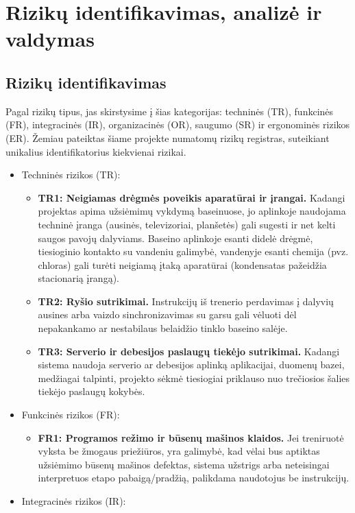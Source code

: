 \section{Rizikų identifikavimas, analizė ir valdymas}
\subsection{Rizikų identifikavimas}
Pagal rizikų tipus, jas skirstysime į šias kategorijas: techninės (TR), funkcinės (FR), integracinės (IR), organizacinės (OR), saugumo (SR) ir ergonominės rizikos (ER). Žemiau pateiktas šiame projekte numatomų rizikų registras, suteikiant unikalius identifikatorius kiekvienai rizikai.

\begin{itemize}
    \item Techninės rizikos (TR):
    \begin{itemize}
        \item \textbf{TR1: Neigiamas drėgmės poveikis aparatūrai ir įrangai.} Kadangi projektas apima užsiėmimų vykdymą baseinuose, jo aplinkoje naudojama techninė įranga (ausinės, televizoriai, planšetės) gali sugesti ir net kelti saugos pavojų dalyviams. Baseino aplinkoje esanti didelė drėgmė, tiesioginio kontakto su vandeniu galimybė, vandenyje esanti chemija (pvz. chloras) gali turėti neigiamą įtaką aparatūrai (kondensatas pažeidžia stacionarią įrangą).
        \item \textbf{TR2: Ryšio sutrikimai.} Instrukcijų iš trenerio perdavimas į dalyvių ausines arba vaizdo sinchronizavimas su garsu gali vėluoti dėl nepakankamo ar nestabilaus belaidžio tinklo baseino salėje.
        \item \textbf{TR3: Serverio ir debesijos paslaugų tiekėjo sutrikimai.} Kadangi sistema naudoja serverio ar debesijos aplinką aplikacijai, duomenų bazei, medžiagai talpinti, projekto sėkmė tiesiogiai priklauso nuo trečiosios šalies tiekėjo paslaugų kokybės.
    \end{itemize}
    \item Funkcinės rizikos (FR):
    \begin{itemize}
        \item \textbf{FR1: Programos režimo ir būsenų mašinos klaidos.} Jei treniruotė vyksta be žmogaus priežiūros, yra galimybė, kad vėlai bus aptiktas užsiėmimo būsenų mašinos defektas, sistema užstrigs arba neteisingai interpretuos etapo pabaigą/pradžią, palikdama naudotojus be instrukcijų.
    \end{itemize}
    \item Integracinės rizikos (IR):

\end{itemize}
